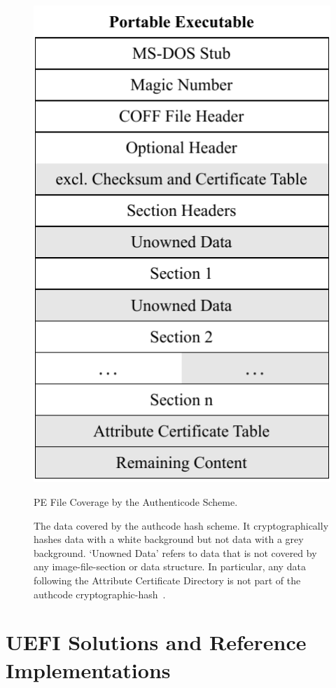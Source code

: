 \begin{figure}[htb]
  \centering
  \includegraphics{Figures/AuthCode.pdf}
  \caption{PE File Coverage by the Authenticode Scheme.}
  \label{fig:authcode}
  \caption*{The  data covered by the \gls{authcode} hash scheme. It cryptographically hashes data with a white background but not data with a grey background. `Unowned Data' refers to data that is not covered by any  \gls{image-file-section} or data structure. In particular, any data following the Attribute Certificate Directory is not part of the  \gls{authcode} \gls{cryptographic-hash}~\cite{pe-authenticode}.}
\end{figure}

\section{UEFI Solutions and Reference Implementations}
\label{sec:uefi_solutions}

